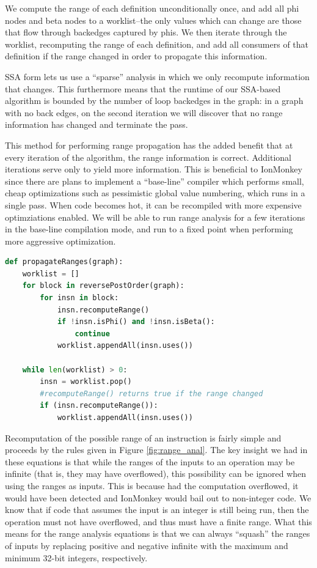 \documentclass{article}
\begin{document}
We compute the range of each definition unconditionally once, and add all phi
nodes and beta nodes to a worklist--the only values which can change are those
that flow through backedges captured by phis. We then iterate through the
worklist, recomputing the range of each definition, and add all consumers of
that definition if the range changed in order to propagate this information.

SSA form lets us use a ``sparse'' analysis in which we only recompute
information that changes. This furthermore means that the runtime of our
SSA-based algorithm is bounded by the number of loop backedges in the graph: in
a graph with no back edges, on the second iteration we will discover that no
range information has changed and terminate the pass.

This method for performing range propagation has the added benefit that at
every iteration of the algorithm, the range information is correct. Additional
iterations serve only to yield more information. This is beneficial to
IonMonkey since there are plans to implement a ``base-line'' compiler which
performs small, cheap optimizations such as pessimistic global value numbering,
which runs in a single pass. When code becomes hot, it can be recompiled with
more expensive optimziations enabled. We will be able to run range analysis for
a few iterations in the base-line compilation mode, and run to a fixed point
when performing more aggressive optimization.

\begin{lstlisting}[language=Python,
                   caption={Pseudocode algorithm for propagating range information},
                   label={lst:propagate_ranges}, float=ht]
def propagateRanges(graph):
    worklist = []
    for block in reversePostOrder(graph):
        for insn in block:
            insn.recomputeRange()
            if !insn.isPhi() and !insn.isBeta():
                continue
            worklist.appendAll(insn.uses())

    while len(worklist) > 0:
        insn = worklist.pop()
        #recomputeRange() returns true if the range changed
        if (insn.recomputeRange()):
            worklist.appendAll(insn.uses())
\end{lstlisting}

Recomputation of the possible range of an instruction is fairly simple
and proceeds by the rules given in Figure \ref{fig:range_anal}. The
key insight we had in these equations is that while the ranges of the
inputs to an operation may be infinite (that is, they may have
overflowed), this possibility can be ignored when using the ranges as
inputs. This is because had the computation overflowed, it would have
been detected and IonMonkey would bail out to non-integer code. We
know that if code that assumes the input is an integer is still being
run, then the operation must not have overflowed, and thus must have a
finite range. What this means for the range analysis equations is that
we can always ``squash'' the ranges of inputs by replacing positive
and negative infinite with the maximum and minimum 32-bit integers,
respectively.
\end{document}

